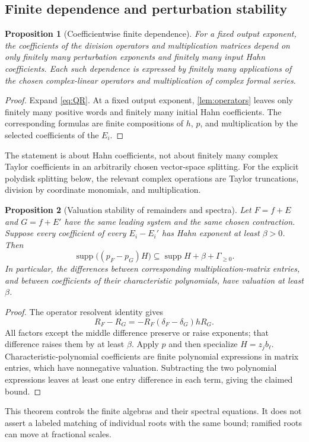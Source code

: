 \documentclass[11pt,letterpaper]{article}
\newtheorem{proposition}[proposition]{Proposition}
\theoremstyle{definition}
\theoremstyle{remark}
\newcommand{\supp}{\operatorname{supp}}
\numberwithin{equation}{section}
\begin{document}
\subsection{Finite dependence and perturbation stability}
\begin{proposition}[Coefficientwise finite dependence]\label{prop:finite}
For a fixed output exponent, the coefficients of the division operators and multiplication matrices depend on only finitely many perturbation exponents and finitely many input Hahn coefficients. Each such dependence is expressed by finitely many applications of the chosen complex-linear operators and multiplication of complex formal series.
\end{proposition}
\begin{proof}
Expand \eqref{eq:QR}. At a fixed output exponent, \cref{lem:operators} leaves only finitely many positive words and finitely many initial Hahn coefficients. The corresponding formulas are finite compositions of $h$, $p$, and multiplication by the selected coefficients of the $E_i$.
\end{proof}
The statement is about Hahn coefficients, not about finitely many complex Taylor coefficients in an arbitrarily chosen vector-space splitting. For the explicit polydisk splitting below, the relevant complex operations are Taylor truncations, division by coordinate monomials, and multiplication.

\begin{proposition}[Valuation stability of remainders and spectra]\label{prop:stability}
Let $F=f+E$ and $G=f+E'$ have the same leading system and the same chosen contraction. Suppose every coefficient of every $E_i-E_i'$ has Hahn exponent at least $\beta>0$. Then
\[
 \supp\bigl((p_F-p_G)H\bigr)
 \subseteq\supp H+\beta+\Gamma_{\geq0}.
\]
In particular, the differences between corresponding multiplication-matrix entries, and between coefficients of their characteristic polynomials, have valuation at least $\beta$.
\end{proposition}
\begin{proof}
The operator resolvent identity gives
\begin{equation}\label{eq:resolvent}
 R_F-R_G=-R_F(\delta_F-\delta_G)hR_G.
\end{equation}
All factors except the middle difference preserve or raise exponents; that difference raises them by at least $\beta$. Apply $p$ and then specialize $H=z_jb_\ell$. Characteristic-polynomial coefficients are finite polynomial expressions in matrix entries, which have nonnegative valuation. Subtracting the two polynomial expressions leaves at least one entry difference in each term, giving the claimed bound.
\end{proof}
This theorem controls the finite algebras and their spectral equations. It does not assert a labeled matching of individual roots with the same bound; ramified roots can move at fractional scales.
\end{document}
